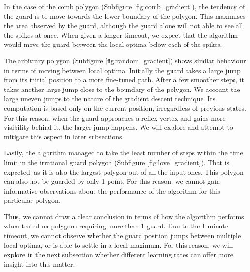 In the case of the comb polygon (Subfigure \ref{fig:comb_gradient}), the tendency of the guard is to move towards the lower boundary of the polygon. This maximises the area observed by the guard, although the guard alone will not able to see all the spikes at once. 
When given a longer timeout, we expect that the algorithm would move the guard between the local optima below each of the spikes. 

The arbitrary polygon (Subfigure \ref{fig:random_gradient}) shows similar behaviour in terms of moving between local optima. Initially the guard takes a large jump from its initial position to a more fine-tuned path. After a few smoother steps, it takes another large jump close to the boundary of the polygon. We account the large uneven jumps to the nature of the gradient descent technique. Its computation is based only on the current position, irregardless of previous states. For this reason, when the guard approaches a reflex vertex and gains more visibility behind it, the larger jump happens. We will explore and attempt to mitigate this aspect in later subsections.

Lastly, the algorithm managed to take the least number of steps within the time limit in the irrational guard polygon (Subfigure \ref{fig:love_gradient}). That is expected, as it is also the largest polygon out of all the input ones. This polygon can also not be guarded by only 1 point. For this reason, we cannot gain informative observations about the performance of the algorithm for this particular polygon.

Thus, we cannot draw a clear conclusion in terms of how the algorithm performs when tested on polygons requiring more than 1 guard. Due to the 1-minute timeout, we cannot observe whether the guard position jumps between multiple local optima, or is able to settle in a local maximum. For this reason, we will explore in the next subsection whether different learning rates can offer more insight into this matter.


